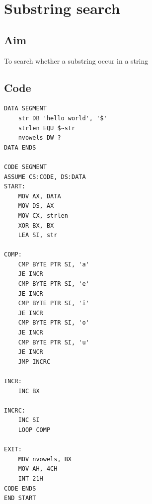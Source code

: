 \section{Substring search}
\subsection{Aim}
To search whether a substring occur in a string

\subsection{Code}
\begin{lstlisting}
DATA SEGMENT
    str DB 'hello world', '$'
    strlen EQU $~str
    nvowels DW ?
DATA ENDS

CODE SEGMENT
ASSUME CS:CODE, DS:DATA
START:
    MOV AX, DATA
    MOV DS, AX
    MOV CX, strlen
    XOR BX, BX
    LEA SI, str

COMP:
    CMP BYTE PTR SI, 'a'
    JE INCR
    CMP BYTE PTR SI, 'e'
    JE INCR
    CMP BYTE PTR SI, 'i'
    JE INCR
    CMP BYTE PTR SI, 'o'
    JE INCR
    CMP BYTE PTR SI, 'u'
    JE INCR
    JMP INCRC
    
INCR:
    INC BX
    
INCRC:
    INC SI
    LOOP COMP
    
EXIT:
    MOV nvowels, BX
    MOV AH, 4CH
    INT 21H
CODE ENDS
END START
\end{lstlisting}

